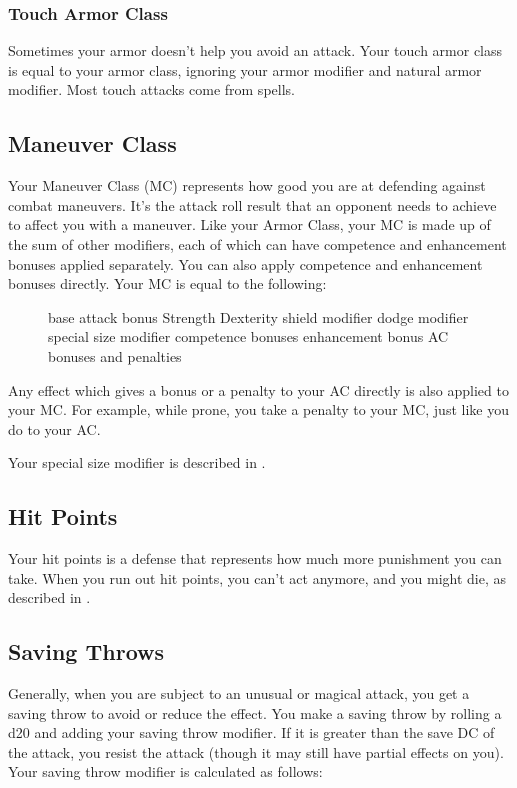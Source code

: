 \subsubsection{Touch Armor Class}
Sometimes your armor doesn't help you avoid an attack. Your touch armor class is equal to your armor class, ignoring your armor modifier and natural armor modifier. Most touch attacks come from spells.

\subsection{Maneuver Class}
Your Maneuver Class (MC) represents how good you are at defending against combat maneuvers. It's the attack roll result that an opponent needs to achieve to affect you with a maneuver. Like your Armor Class, your MC is made up of the sum of other modifiers, each of which can have competence and enhancement bonuses applied separately. You can also apply competence and enhancement bonuses directly. Your MC is equal to the following:

\begin{figure}[h]
     \add base attack bonus \add Strength \add Dexterity \add shield modifier \add dodge modifier \add special size modifier \add competence bonuses \add enhancement bonus \add AC bonuses and penalties
\end{figure}

Any effect which gives a bonus or a penalty to your AC directly is also applied to your MC. For example, while prone, you take a  penalty to your MC, just like you do to your AC. 

Your special size modifier is described in .

\subsection{Hit Points}
Your hit points is a defense that represents how much more punishment you can take. When you run out hit points, you can't act anymore, and you might die, as described in .

\subsection{Saving Throws}
Generally, when you are subject to an unusual or magical attack, you get a saving throw to avoid or reduce the effect. You make a saving throw by rolling a d20 and adding your saving throw modifier. If it is greater than the save DC of the attack, you resist the attack (though it may still have partial effects on you). Your saving throw modifier is calculated as follows:

